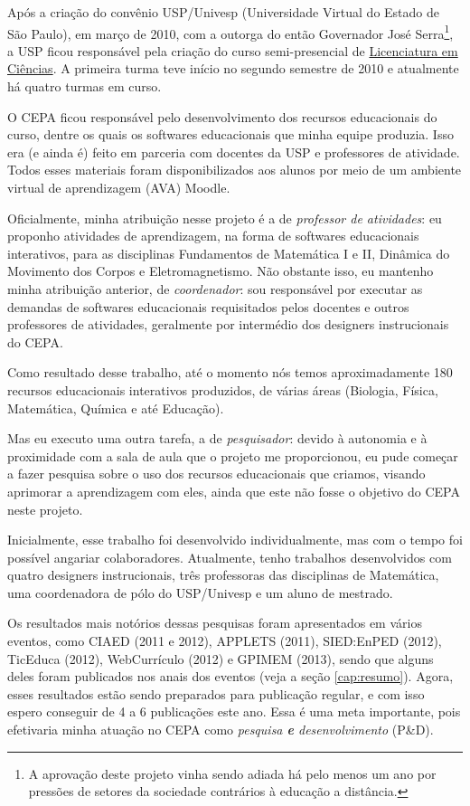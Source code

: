 Após a criação do convênio USP/Univesp (Universidade Virtual do Estado de São Paulo), em março de 2010, com a outorga do então Governador José Serra\footnote{A aprovação deste projeto vinha sendo adiada há pelo menos um ano por pressões de setores da sociedade contrários à educação a distância.}, a USP ficou responsável pela criação do curso semi-presencial de \href{http://licenciaturaciencias.usp.br/}{Licenciatura em Ciências}. A primeira turma teve início no segundo semestre de 2010 e atualmente há quatro turmas em curso.

O CEPA ficou responsável pelo desenvolvimento dos recursos educacionais do curso, dentre os quais os softwares educacionais que minha equipe produzia. Isso era (e ainda é) feito em parceria com docentes da USP e professores de atividade. Todos esses materiais foram disponibilizados aos alunos por meio de um ambiente virtual de aprendizagem (AVA) Moodle.

Oficialmente, minha atribuição nesse projeto é a de \emph{professor de atividades}: eu proponho atividades de aprendizagem, na forma de softwares educacionais interativos, para as disciplinas Fundamentos de Matemática I e II, Dinâmica do Movimento dos Corpos e Eletromagnetismo. Não obstante isso, eu mantenho minha atribuição anterior, de \emph{coordenador}: sou responsável por executar as demandas de softwares educacionais requisitados pelos docentes e outros professores de atividades, geralmente por intermédio dos designers instrucionais do CEPA.

Como resultado desse trabalho, até o momento nós temos aproximadamente 180 recursos educacionais interativos produzidos, de várias áreas (Biologia, Física, Matemática, Química e até Educação).

Mas eu executo uma outra tarefa, a de \emph{pesquisador}: devido à autonomia e à proximidade com a sala de aula que o projeto me proporcionou, eu pude começar a fazer pesquisa sobre o uso dos recursos educacionais que criamos, visando aprimorar a aprendizagem com eles, ainda que este não fosse o objetivo do CEPA neste projeto.

Inicialmente, esse trabalho foi desenvolvido individualmente, mas com o tempo foi possível angariar colaboradores. Atualmente, tenho trabalhos desenvolvidos com quatro designers instrucionais, três professoras das disciplinas de Matemática, uma coordenadora de pólo do USP/Univesp e um aluno de mestrado.

Os resultados mais notórios dessas pesquisas foram apresentados em vários eventos, como CIAED (2011 e 2012), APPLETS (2011), SIED:EnPED (2012), TicEduca (2012), WebCurrículo (2012) e GPIMEM (2013), sendo que alguns deles foram publicados nos anais dos eventos (veja a seção \ref{cap:resumo}). Agora, esses resultados estão sendo preparados para publicação regular, e com isso espero conseguir de 4 a 6 publicações este ano. Essa é uma meta importante, pois efetivaria minha atuação no CEPA como \emph{pesquisa \textbf{e} desenvolvimento} (P\&D).

